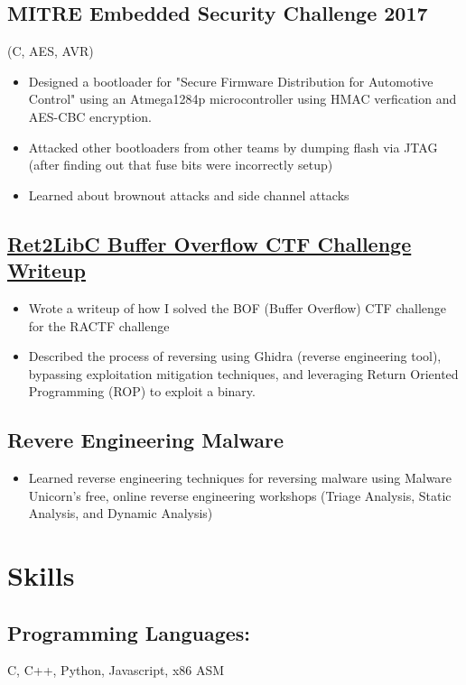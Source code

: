 \documentclass{article}
\begin{document}
\subsection{MITRE Embedded Security Challenge 2017} (C, AES, AVR)
\begin{itemize}
    \item Designed a bootloader for "Secure Firmware Distribution for Automotive Control" using an Atmega1284p microcontroller using HMAC verfication and AES-CBC encryption.
    \item Attacked other bootloaders from other teams by dumping flash via JTAG (after finding out that fuse bits were incorrectly setup)
    \item Learned about brownout attacks and side channel attacks
\end{itemize}

\subsection{\href{https://jacobshin.com/posts/castorsctf-babybof1pt2/}{Ret2LibC Buffer Overflow CTF Challenge Writeup}}
\begin{itemize}
    \item Wrote a writeup of how I solved the BOF (Buffer Overflow) CTF challenge for the RACTF challenge
    \item Described the process of reversing using Ghidra (reverse engineering tool), bypassing exploitation mitigation techniques, and leveraging Return Oriented Programming (ROP) to exploit a binary.
\end{itemize}

\subsection{Revere Engineering Malware}
\begin{itemize}
    \item Learned reverse engineering techniques for reversing malware using Malware Unicorn's free, online reverse engineering workshops (Triage Analysis, Static Analysis, and Dynamic Analysis)
\end{itemize}

\section{Skills}
\subsection{Programming Languages:}
C, C++, Python, Javascript, x86 ASM
\end{document}
